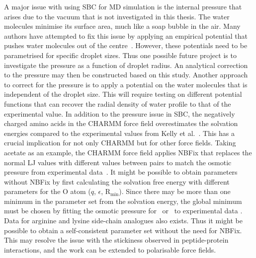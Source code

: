 A major issue with using SBC for MD simulation is the internal pressure that arises due 
to the vacuum that is not investigated in this thesis. The water molecules minimise its 
surface area, much like a soap bubble in the air. Many authors have attempted to fix this issue 
by applying an empirical potential that pushes water molecules out of the 
centre~\cite{Essex1995,Marelius1999,Deng2004}. However, these potentials need to be 
parametrised for specific droplet sizes. Thus one possible future project is to investigate 
the pressure as a function of droplet radius. An analytical correction to the pressure may 
then be constructed based on this study. Another approach to correct for the pressure is to 
apply a potential on the water molecules that is independent of the droplet size. This will 
require testing on different potential functions that can recover the radial density of water 
profile to that of the experimental value. In addition to the pressure issue in SBC, the 
negatively charged amino acids in the CHARMM force field overestimates the solvation energies 
compared to the experimental values from Kelly et al.~\cite{Kelly2006}. This has a crucial 
implication for not only CHARMM but for other force fields. Taking acetate as an example, 
the CHARMM force field applies NBFix that replaces the normal LJ values with different 
values between pairs to match the osmotic pressure from experimental data~\cite{Venable2013}. 
It might be possible to obtain parameters without NBFix by first calculating the solvation 
free energy with different parameters for the O atom ($q$, $\epsilon$, R$_{\text{min}}$). 
Since there may be more than one minimum in the parameter set from the solvation energy, 
the global minimum must be chosen by fitting the osmotic pressure for \Na\ or \K\ to 
experimental data \cite{Robinson2002}. Data for arginine and lysine side-chain analogues 
also exists. Thus it might be possible to obtain a self-consistent parameter set without 
the need for NBFix. This may resolve the issue with the stickiness observed in peptide-protein 
interactions, and the work can be extended to polarisable force fields.
